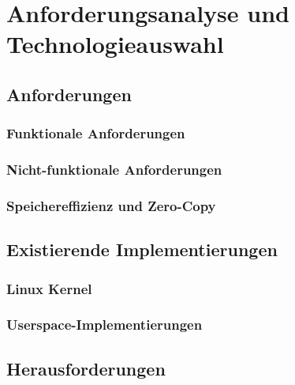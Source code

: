 
\chapter{Anforderungsanalyse und Technologieauswahl}
\label{chap:analyse}

\section{Anforderungen}
\label{sec:anforderungen}

\subsection{Funktionale Anforderungen}
\label{subsec:funktionale-anforderungen}

\subsection{Nicht-funktionale Anforderungen}
\label{subsec:nicht-funktionale-anforderungen}

\subsection{Speichereffizienz und Zero-Copy}
\label{subsec:zero-copy}

\section{Existierende Implementierungen}
\label{sec:existierende-implementierungen}

\subsection{Linux Kernel}
\label{subsec:linux-kernel}

\subsection{Userspace-Implementierungen}
\label{subsec:userspace}

\section{Herausforderungen}
\label{sec:herausforderungen}

